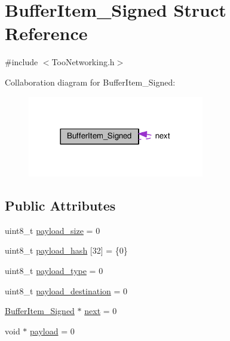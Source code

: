 \hypertarget{structBufferItem__Signed}{}\section{Buffer\+Item\+\_\+\+Signed Struct Reference}
\label{structBufferItem__Signed}


{\ttfamily \#include $<$Too\+Networking.\+h$>$}



Collaboration diagram for Buffer\+Item\+\_\+\+Signed\+:\nopagebreak
\begin{figure}[H]
\begin{center}
\leavevmode
\includegraphics[width=218pt]{structBufferItem__Signed__coll__graph}
\end{center}
\end{figure}
\subsection*{Public Attributes}
\begin{DoxyCompactItemize}
\item 
uint8\+\_\+t \hyperlink{structBufferItem__Signed_a99af0ec40a5d44a11df8592667fe7614}{payload\+\_\+size} = 0
\item 
uint8\+\_\+t \hyperlink{structBufferItem__Signed_aea55c4b9fa78da421de8f83df370fb57}{payload\+\_\+hash} \mbox{[}32\mbox{]} = \{0\}
\item 
uint8\+\_\+t \hyperlink{structBufferItem__Signed_a75a67331ae70b15b59ba8941313e4fce}{payload\+\_\+type} = 0
\item 
uint8\+\_\+t \hyperlink{structBufferItem__Signed_ad71dae240fb681bedb0c0332fff403fe}{payload\+\_\+destination} = 0
\item 
\hyperlink{structBufferItem__Signed}{Buffer\+Item\+\_\+\+Signed} $\ast$ \hyperlink{structBufferItem__Signed_a86ea87809ef5786a04f1218ac028fa13}{next} = 0
\item 
void $\ast$ \hyperlink{structBufferItem__Signed_a4f268b032fb161b2c73daad2d2659291}{payload} = 0
\end{DoxyCompactItemize}


